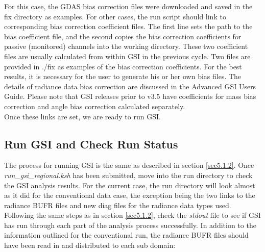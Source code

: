 \begin{itemize}
For this case, the GDAS bias correction files were downloaded and saved in the fix directory as examples. For other cases, the run script should link to corresponding bias correction coefficient files. The first line sets the path to the bias coefficient file, and the second copies the bias correction coefficients for passive (monitored) channels into the working directory. These two coefficient files are usually calculated from within GSI in the previous cycle. Two files are provided in ./fix as examples of the bias correction coefficients. For the best results, it is necessary for the user to generate his or her own bias files. The details of radiance data bias correction are discussed in the Advanced GSI User\textquotesingle s Guide. Please note that GSI releases prior to v3.5 have coefficients for mass bias correction and angle bias correction calculated separately. \\

Once these links are set, we are ready to run GSI. 


\end{itemize}

\subsection{Run GSI and Check Run Status}
\label{sec5.2.2}

The process for running GSI is the same as described in section \ref{sec5.1.2}.  Once \textit{run\_gsi\_regional.ksh} has been submitted, move into the run directory to check the GSI analysis results. For the current case, the run directory will look almost as it did for the conventional data case, the exception being the two links to the radiance BUFR files and new diag files for the radiance data types used. Following the same steps as in section \ref{sec5.1.2}, check the \textit{stdout} file to see if GSI has run through each part of the analysis process successfully.  In addition to the information outlined for the conventional run, the radiance BUFR files should have been read in and distributed to each sub domain: 

